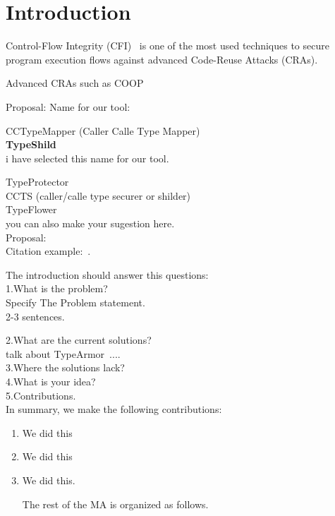 \chapter{Introduction}
\label{chapter:Introduction}
Control-Flow Integrity (CFI)~\cite{abadi:cfi, abadi:cfi2} is one of the most used techniques
to secure program execution flows against advanced Code-Reuse Attacks (CRAs).

Advanced CRAs such as COOP~\cite{schuster:coop}


Proposal: Name for our tool: 

CCTypeMapper (Caller Calle Type Mapper) \\ 
 
\textbf{TypeShild} \\ 
i have selected this name for our tool.
 
TypeProtector \\ 

CCTS (caller/calle type securer or shilder) \\ 

TypeFlower \\ 

you can also make your sugestion here. \\ 

Proposal: \\ 

Citation example:~\cite{latex}. 

The introduction should answer this questions:
\\

1.What is the problem? 
\\

Specify The Problem statement. 
\\
2-3 sentences.

2.What are the current solutions?
\\
talk about TypeArmor~\cite{veen:typearmor}....\\

3.Where the solutions lack?
\\

4.What is your idea?
\\

5.Contributions.
\\

In summary, we make the following contributions:

\begin{enumerate}
 \item We did this 
 
 \item We did this 
 
 \item We did this.
 
 The rest of the MA is organized as follows.
 
\end{enumerate}

